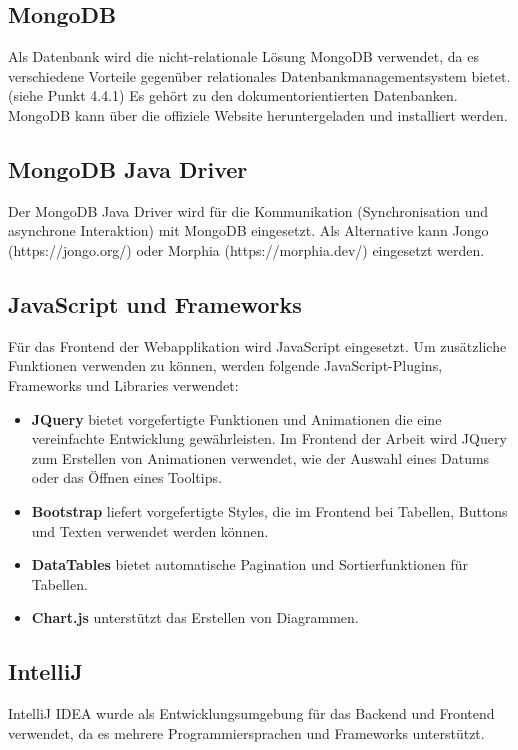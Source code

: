 \subsection{MongoDB} 
Als Datenbank wird die nicht-relationale Lösung MongoDB verwendet, da es verschiedene Vorteile gegenüber relationales Datenbankmanagementsystem bietet. (siehe Punkt 4.4.1) Es gehört zu den dokumentorientierten Datenbanken.
MongoDB kann über die offiziele Website heruntergeladen und installiert werden. \cite{mongoDbManual}

\subsection{MongoDB Java Driver}
Der MongoDB Java Driver wird für die Kommunikation (Synchronisation und asynchrone Interaktion) mit MongoDB eingesetzt. Als Alternative kann Jongo (https://jongo.org/) oder  Morphia (https://morphia.dev/) eingesetzt werden. 

\subsection{JavaScript und Frameworks}
Für das Frontend der Webapplikation wird JavaScript eingesetzt. Um zusätzliche Funktionen verwenden zu können, werden folgende JavaScript-Plugins, Frameworks und Libraries verwendet: 
\begin{itemize}
\item \textbf{JQuery} bietet vorgefertigte Funktionen und Animationen die eine vereinfachte Entwicklung gewährleisten. Im Frontend der Arbeit wird JQuery zum Erstellen von Animationen verwendet, wie der Auswahl eines Datums oder das Öffnen eines Tooltips.
\item \textbf{Bootstrap} liefert vorgefertigte Styles, die im Frontend bei Tabellen, Buttons und Texten verwendet werden können.
\item \textbf{DataTables} bietet automatische Pagination und Sortierfunktionen für Tabellen.
\item \textbf{Chart.js} unterstützt das Erstellen von Diagrammen. 
\end{itemize}

\subsection{IntelliJ}
IntelliJ IDEA wurde als Entwicklungsumgebung für das Backend und Frontend verwendet, da es mehrere Programmiersprachen und Frameworks unterstützt.

